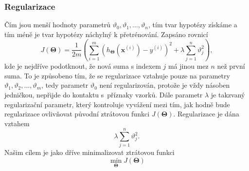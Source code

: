 \subsubsection*{Regularizace}
\par{Čím jsou menší hodnoty parametrů $\vartheta_0,\vartheta_1, \ldots , \vartheta_n$, tím  tvar hypotézy získáme a tím méně je tvar hypotézy náchylný k přetrénování. Zapsáno rovnicí
\begin{equation}
	J \left( \bm{\Theta} \right) = \frac{1}{2m} \left( \sum_{i = 1}^{m} \left( h_{\bm{\Theta}} \left( \bm{x}^{\left( i \right)} \right) - y^{\left( i \right)} \right)^2 + \lambda \sum_{j = 1}^{n} \vartheta_j^2 \right),
\end{equation}
kde je nejdříve podotknout, že nová suma s indexem $j$ má jinou mez $n$ než první suma. To je způsobeno tím, že se regularizace vztahuje pouze na parametry $\vartheta_1, \vartheta_2, \ldots , \vartheta_m$, tedy parametr $\vartheta_0$ není regularizován, protože je vždy násoben jedničkou, nepřijde do kontaktu s~příznaky vzorků. Dále parametr $\lambda$ je takzvaný regularizační parametr, který kontroluje vyvážení mezi tím, jak hodně bude regularizace ovlivňovat původní ztrátovou funkci $J \left( \bm{\Theta} \right)$. Regularizace je dána vztahem 
\begin{equation}
	\lambda \sum_{j = 1}^{n} \vartheta_j^2.
\end{equation}
Našim cílem je jako dříve minimalizovat ztrátovou funkci
\begin{equation}
	\min_{\bm{\Theta}} J \left( \bm{\Theta} \right)
\end{equation}}

